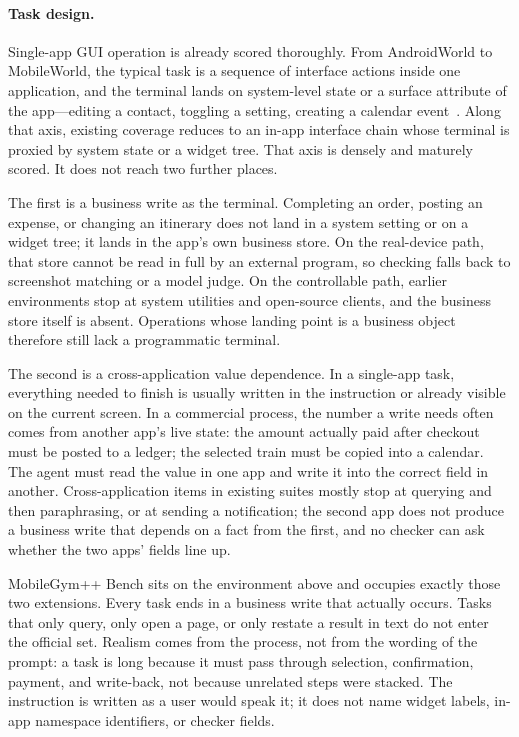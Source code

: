 \paragraph{Task design.}
Single-app GUI operation is already scored thoroughly. From AndroidWorld to MobileWorld, the typical task is a sequence of interface actions inside one application, and the terminal lands on system-level state or a surface attribute of the app---editing a contact, toggling a setting, creating a calendar event~\citep{rawles2025androidworld,kong2025mobileworld}. Along that axis, existing coverage reduces to an in-app interface chain whose terminal is proxied by system state or a widget tree. That axis is densely and maturely scored. It does not reach two further places.

The first is a business write as the terminal. Completing an order, posting an expense, or changing an itinerary does not land in a system setting or on a widget tree; it lands in the app's own business store. On the real-device path, that store cannot be read in full by an external program, so checking falls back to screenshot matching or a model judge. On the controllable path, earlier environments stop at system utilities and open-source clients, and the business store itself is absent. Operations whose landing point is a business object therefore still lack a programmatic terminal.

The second is a cross-application value dependence. In a single-app task, everything needed to finish is usually written in the instruction or already visible on the current screen. In a commercial process, the number a write needs often comes from another app's live state: the amount actually paid after checkout must be posted to a ledger; the selected train must be copied into a calendar. The agent must read the value in one app and write it into the correct field in another. Cross-application items in existing suites mostly stop at querying and then paraphrasing, or at sending a notification; the second app does not produce a business write that depends on a fact from the first, and no checker can ask whether the two apps' fields line up.

MobileGym++ Bench sits on the environment above and occupies exactly those two extensions. Every task ends in a business write that actually occurs. Tasks that only query, only open a page, or only restate a result in text do not enter the official set. Realism comes from the process, not from the wording of the prompt: a task is long because it must pass through selection, confirmation, payment, and write-back, not because unrelated steps were stacked. The instruction is written as a user would speak it; it does not name widget labels, in-app namespace identifiers, or checker fields.

